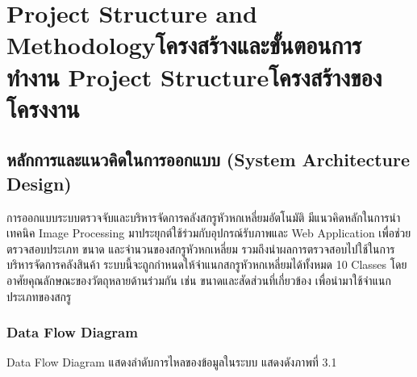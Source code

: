 \chapter{\ifproject%
\ifenglish Project Structure and Methodology\else โครงสร้างและขั้นตอนการทำงาน\fi
\else%
\ifenglish Project Structure\else โครงสร้างของโครงงาน\fi
\fi
}

\makeatletter


\makeatother

\section{หลักการและแนวคิดในการออกแบบ (System Architecture Design)}
\sloppy
การออกแบบระบบตรวจจับและบริหารจัดการคลังสกรูหัวหกเหลี่ยมอัตโนมัติ มีแนวคิดหลักในการนำเทคนิค Image Processing มาประยุกต์ใช้ร่วมกับอุปกรณ์รับภาพและ Web Application เพื่อช่วยตรวจสอบประเภท ขนาด และจำนวนของสกรูหัวหกเหลี่ยม รวมถึงนำผลการตรวจสอบไปใช้ในการบริหารจัดการคลังสินค้า ระบบนี้จะถูกกำหนดให้จำแนกสกรูหัวหกเหลี่ยมได้ทั้งหมด 10 Classes โดยอาศัยคุณลักษณะของวัตถุหลายด้านร่วมกัน เช่น ขนาดและสัดส่วนที่เกี่ยวข้อง เพื่อนำมาใช้จำแนกประเภทของสกรู

\subsection{Data Flow Diagram}

Data Flow Diagram แสดงลำดับการไหลของข้อมูลในระบบ แสดงดังภาพที่ 3.1

